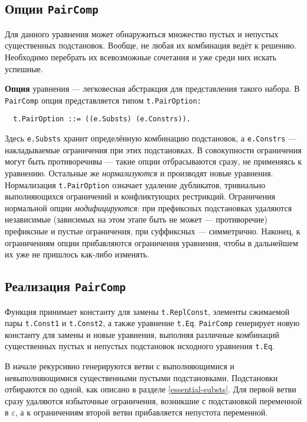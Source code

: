 \documentclass[12pt]{article}
\begin{document}
\subsection{Опции \texttt{PairComp}} \label{pair-option}

Для данного уравнения может обнаружиться множество пустых и непустых
существенных подстановок. Вообще, не любая их комбинация ведёт к решению.
Необходимо перебрать их всевозможные сочетания и уже среди них искать
успешные.

\textbf{Опция} уравнения --- легковесная абстракция для представления такого
набора. В \texttt{PairComp} опция представляется типом \texttt{t.PairOption:}
\begin{Verbatim}
  t.PairOption ::= ((e.Substs) (e.Constrs)).
\end{Verbatim}
Здесь \texttt{e.Substs} хранит определённую комбинацию подстановок, а
\texttt{e.Constrs} --- накладываемые ограничения при этих подстановках. В
совокупности ограничения могут быть противоречивы --- такие опции отбрасываются
сразу, не применяясь к уравнению. Остальные же \textit{нормализуются} и
производят новые уравнения. Нормализация \texttt{t.PairOption} означает
удаление дубликатов, тривиально выполняющихся ограничений и конфликтующих
рестрикций. Ограничения нормальной опции \textit{модифицируются}: при
префиксных подстановках удаляются независимые (зависимых на этом этапе быть не
может --- противоречие) префиксные и пустые ограничения, при суффиксных ---
симметрично. Наконец, к ограничениям опции прибавляются ограничения уравнения,
чтобы в дальнейшем их уже не пришлось как-либо изменять.


\subsection{Реализация \texttt{PairComp}}

Функция принимает константу для замены \texttt{t.ReplConst}, элементы сжимаемой
пары \texttt{t.Const1} и \texttt{t.Const2}, а также уравнение \texttt{t.Eq}.
\texttt{PairComp} генерирует новую константу для замены и новые уравнения,
выполняя различные комбинаций существенных пустых и непустых подстановок
исходного уравнения \texttt{t.Eq}.

В начале рекурсивно генерируются ветви с выполняющимися и невыполняющимися
существенными пустыми подстановками. Подстановки отбираются по одной, как
описано в разделе \ref{essential-substs}. Для первой ветви сразу удаляются
избыточные ограничения, возникшие с подстановкой переменной в $\varepsilon$,
а к ограничениям второй ветви прибавляется непустота переменной.
\end{document}
